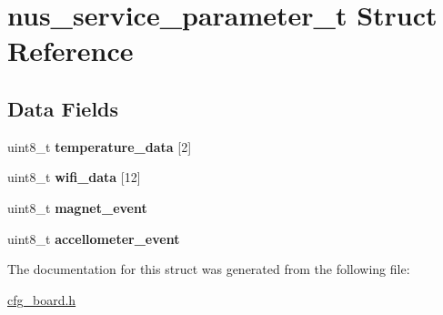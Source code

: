 \hypertarget{structnus__service__parameter__t}{}\section{nus\+\_\+service\+\_\+parameter\+\_\+t Struct Reference}
\label{structnus__service__parameter__t}
\subsection*{Data Fields}
\begin{DoxyCompactItemize}
\item 
\mbox{\label{structnus__service__parameter__t_a758a111e5668bd9125f515c133281af2}} 
uint8\+\_\+t {\bfseries temperature\+\_\+data} \mbox{[}2\mbox{]}
\item 
\mbox{\label{structnus__service__parameter__t_aebf41b96710cf8172ebeacae6302fec5}} 
uint8\+\_\+t {\bfseries wifi\+\_\+data} \mbox{[}12\mbox{]}
\item 
\mbox{\label{structnus__service__parameter__t_a02660297e33f30ce07f4fabfe10c30f9}} 
uint8\+\_\+t {\bfseries magnet\+\_\+event}
\item 
\mbox{\label{structnus__service__parameter__t_a7617a649fa1ce66d501029689d430bb1}} 
uint8\+\_\+t {\bfseries accellometer\+\_\+event}
\end{DoxyCompactItemize}


The documentation for this struct was generated from the following file\+:\begin{DoxyCompactItemize}
\item 
\hyperlink{cfg__board_8h}{cfg\+\_\+board.\+h}\end{DoxyCompactItemize}
